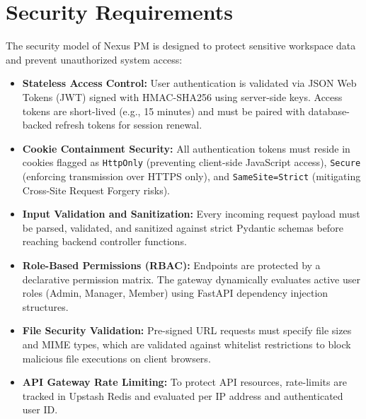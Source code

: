 \section{Security Requirements}
The security model of Nexus PM is designed to protect sensitive workspace data and prevent unauthorized system access:
\begin{itemize}
    \item \textbf{Stateless Access Control:} User authentication is validated via JSON Web Tokens (JWT) signed with HMAC-SHA256 using server-side keys. Access tokens are short-lived (e.g., 15 minutes) and must be paired with database-backed refresh tokens for session renewal.
    \item \textbf{Cookie Containment Security:} All authentication tokens must reside in cookies flagged as \texttt{HttpOnly} (preventing client-side JavaScript access), \texttt{Secure} (enforcing transmission over HTTPS only), and \texttt{SameSite=Strict} (mitigating Cross-Site Request Forgery risks).
    \item \textbf{Input Validation and Sanitization:} Every incoming request payload must be parsed, validated, and sanitized against strict Pydantic schemas before reaching backend controller functions.
    \item \textbf{Role-Based Permissions (RBAC):} Endpoints are protected by a declarative permission matrix. The gateway dynamically evaluates active user roles (Admin, Manager, Member) using FastAPI dependency injection structures.
    \item \textbf{File Security Validation:} Pre-signed URL requests must specify file sizes and MIME types, which are validated against whitelist restrictions to block malicious file executions on client browsers.
    \item \textbf{API Gateway Rate Limiting:} To protect API resources, rate-limits are tracked in Upstash Redis and evaluated per IP address and authenticated user ID.
\end{itemize}

